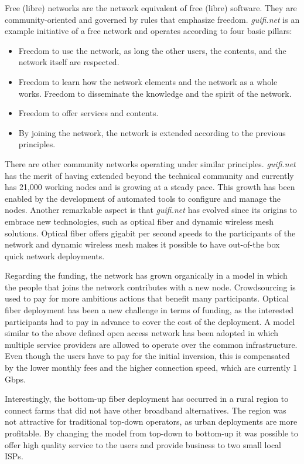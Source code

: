 \documentclass[journal]{IEEEtran}
\begin{document}
Free (libre) networks are the network equivalent of free (libre) software.
They are community-oriented and governed by rules that emphasize freedom.
\emph{guifi.net} is an example initiative of a free network and operates according to four basic pillars:
\begin{itemize}
\item Freedom to use the network, as long the other users, the contents, and the network itself are respected.
\item Freedom to learn how the network elements and the network as a whole works. Freedom to disseminate the knowledge and the spirit of the network.
\item Freedom to offer services and contents.
\item By joining the network, the network is extended according to the previous principles.
\end{itemize}

There are other community networks operating under similar principles.
\emph{guifi.net} has the merit of having extended beyond the technical community and currently has 21,000 working nodes and is growing at a steady pace.
This growth has been enabled by the development of automated tools to configure and manage the nodes.
Another remarkable aspect is that \emph{guifi.net} has evolved since its origins to embrace new technologies, such as optical fiber and dynamic wireless mesh solutions.
Optical fiber offers gigabit per second speeds to the participants of the network and dynamic wireless mesh makes it possible to have out-of-the box quick network deployments.

Regarding the funding, the network has grown organically in a model in which the people that joins the network contributes with a new node.
Crowdsourcing is used to pay for more ambitious actions that benefit many participants.
Optical fiber deployment has been a new challenge in terms of funding, as the interested participants had to pay in advance to cover the cost of the deployment.
A model similar to the above defined open access network has been adopted in which multiple service providers are allowed to operate over the common infrastructure.
Even though the users have to pay for the initial inversion, this is compensated by the lower monthly fees and the higher connection speed, which are currently 1 Gbps.

Interestingly,  the bottom-up fiber deployment has occurred in a rural region to connect farms that did not have other broadband alternatives.
The region was not attractive for traditional top-down operators, as urban deployments are more profitable.
By changing the model from top-down to bottom-up it was possible to offer high quality service to the users and provide business to two small local ISPs.
\end{document}
